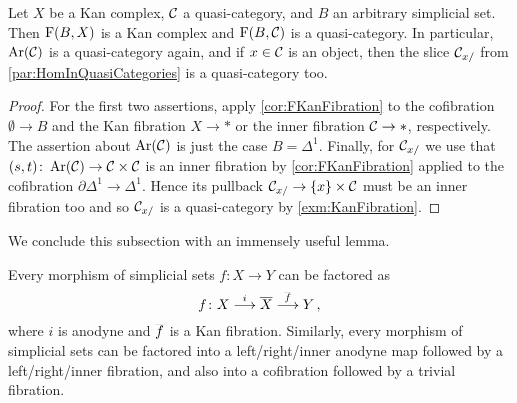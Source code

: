 \begin{cor}\label{cor:FIsKanComplex}
	Let $X$ be a Kan complex, $\mathcal{C}$ a quasi-category, and $B$ an arbitrary simplicial set. Then $\operatorname{F}(B,X)$ is a Kan complex and $\operatorname{F}(B,\mathcal{C})$ is a quasi-category. In particular, $\operatorname{Ar}(\mathcal{C})$ is a quasi-category again, and if $x\in \mathcal{C}$ is an object, then the slice $\mathcal{C}_{x/}$ from \cref{par:HomInQuasiCategories} is a quasi-category too.
\end{cor}
\begin{proof}
	For the first two assertions, apply \cref{cor:FKanFibration} to the cofibration $\emptyset\rightarrow B$ and the Kan fibration $X\rightarrow *$ or the inner fibration $\mathcal{C}\rightarrow *$, respectively. The assertion about $\operatorname{Ar}(\mathcal{C})$ is just the case $B=\Delta^1$. Finally, for $\mathcal{C}_{x/}$ we use that $(s,t)\colon \operatorname{Ar}(\mathcal{C})\rightarrow \mathcal{C}\times\mathcal{C}$ is an inner fibration by \cref{cor:FKanFibration} applied to the cofibration $\partial\Delta^1\rightarrow\Delta^1$. Hence its pullback $\mathcal{C}_{x/}\rightarrow \{x\}\times \mathcal{C}$ must be an inner fibration too and so $\mathcal{C}_{x/}$ is a quasi-category by \cref{exm:KanFibration}.
\end{proof}
We conclude this subsection with an immensely useful lemma.
\begin{lem}\label{lem:SmallObjectArgument}
	Every morphism of simplicial sets $f\colon X\rightarrow Y$ can be factored as
	\begin{equation*}
		f\colon X\overset{i}{\longrightarrow}\ov X\overset{\ov f}{\longrightarrow}Y\,,
	\end{equation*}
	where $i$ is anodyne and $\ov f$ is a Kan fibration. Similarly, every morphism of simplicial sets can be factored into a left/right/inner anodyne map followed by a left/right/inner fibration, and also into a cofibration followed by a trivial fibration.
\end{lem}
